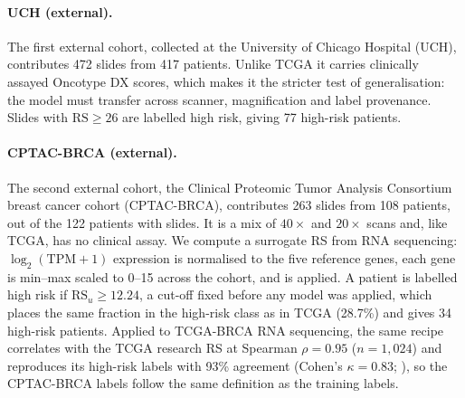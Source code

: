 \documentclass{midl} %
\begin{document}
\paragraph{UCH (external).}
The first external cohort, collected at the University of Chicago Hospital (UCH), contributes
472 slides from 417 patients. Unlike TCGA it carries clinically assayed Oncotype DX scores,
which makes it the stricter test of generalisation: the model must transfer across scanner,
magnification and label provenance. Slides with $\mathrm{RS} \geq 26$ are labelled high risk,
giving 77 high-risk patients.

\paragraph{CPTAC-BRCA (external).}
The second external cohort, the Clinical Proteomic Tumor Analysis Consortium breast cancer
cohort (CPTAC-BRCA), contributes 263 slides from 108 patients, out of the 122 patients with
slides. It is a mix of $40\times$ and $20\times$ scans and, like TCGA, has no clinical assay.
We compute a surrogate RS from RNA sequencing: $\log_2(\mathrm{TPM}+1)$ expression is
normalised to the five reference genes, each gene is min--max scaled to 0--15 across the
cohort, and  is applied. A patient is labelled high risk if
$\mathrm{RS}_u \geq 12.24$, a cut-off fixed before any model was applied, which places the same
fraction in the high-risk class as in TCGA (28.7\%) and gives 34 high-risk patients. Applied to
TCGA-BRCA RNA sequencing, the same recipe correlates with the TCGA research RS at Spearman
$\rho = 0.95$ ($n = 1{,}024$) and reproduces its high-risk labels with 93\% agreement (Cohen's
$\kappa = 0.83$; ), so the CPTAC-BRCA labels follow the same definition
as the training labels.
\end{document}
